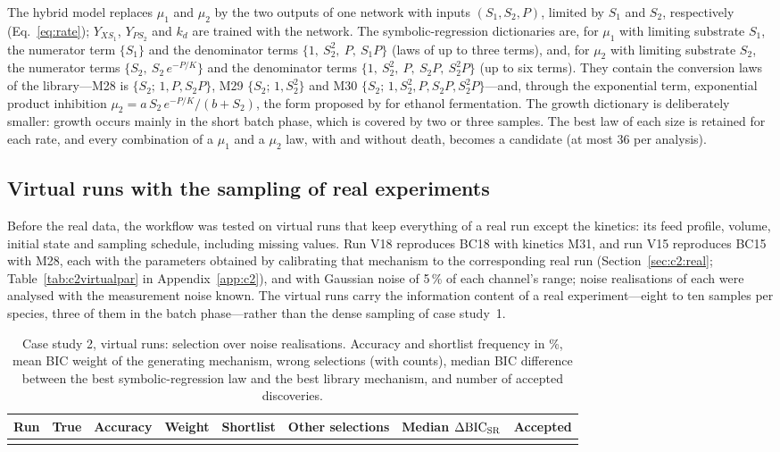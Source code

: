 The hybrid model replaces $\mu_1$ and $\mu_2$ by the two outputs of one network with inputs $(S_1,S_2,P)$, limited by $S_1$ and $S_2$, respectively (Eq.~\eqref{eq:rate}); $Y_{XS_1}$, $Y_{PS_2}$ and $k_d$ are trained with the network. The symbolic-regression dictionaries are, for $\mu_1$ with limiting substrate $S_1$, the numerator term $\{S_1\}$ and the denominator terms $\{1,\ S_2^2,\ P,\ S_1P\}$ (laws of up to three terms), and, for $\mu_2$ with limiting substrate $S_2$, the numerator terms $\{S_2,\ S_2\,e^{-P/K}\}$ and the denominator terms $\{1,\ S_2^2,\ P,\ S_2P,\ S_2^2P\}$ (up to six terms). They contain the conversion laws of the library---M28 is $\{S_2;\,1,P,S_2P\}$, M29 $\{S_2;\,1,S_2^2\}$ and M30 $\{S_2;\,1,S_2^2,P,S_2P,S_2^2P\}$---and, through the exponential term, exponential product inhibition $\mu_2 = a\,S_2\,e^{-P/K}/(b+S_2)$, the form proposed by \citet{Aiba1968} for ethanol fermentation. The growth dictionary is deliberately smaller: growth occurs mainly in the short batch phase, which is covered by two or three samples. The best law of each size is retained for each rate, and every combination of a $\mu_1$ and a $\mu_2$ law, with and without death, becomes a candidate (at most 36 per analysis).

\subsection{Virtual runs with the sampling of real experiments}\label{sec:c2:virtual}
Before the real data, the workflow was tested on virtual runs that keep everything of a real run except the kinetics: its feed profile, volume, initial state and sampling schedule, including missing values. Run V18 reproduces BC18 with kinetics M31, and run V15 reproduces BC15 with M28, each with the parameters obtained by calibrating that mechanism to the corresponding real run (Section~\ref{sec:c2:real}; Table~\ref{tab:c2virtualpar} in Appendix~\ref{app:c2}), and with Gaussian noise of 5\,\% of each channel's range; \VeighteenN{} noise realisations of each were analysed with the measurement noise known. The virtual runs carry the information content of a real experiment---eight to ten samples per species, three of them in the batch phase---rather than the dense sampling of case study~1.

\begin{table}[width=\textwidth,cols=8,pos=t]
\caption{Case study 2, virtual runs: selection over \VeighteenN{} noise realisations. Accuracy and shortlist frequency in \%, mean BIC weight of the generating mechanism, wrong selections (with counts), median BIC difference between the best symbolic-regression law and the best library mechanism, and number of accepted discoveries.}\label{tab:c2virtual}
\begin{tabular*}{\tblwidth}{@{}LLCCCLCC@{}}
\toprule
Run & True & Accuracy & Weight & Shortlist & Other selections & Median $\Delta\mathrm{BIC}_{\mathrm{SR}}$ & Accepted \\
\midrule
{}
\bottomrule
\end{tabular*}
\end{table}

